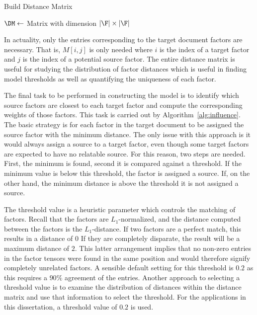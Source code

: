 \documentclass[../ut-dissertation.tex]{subfiles}
\begin{document}
\begin{algorithm}[p]
  \caption{Build Distance Matrix}
  \label{alg:distance}
   
  \Input{\F}
  \Output{\DM}
  \BlankLine
  $\DM \leftarrow $ Matrix with dimension $|\F| \times |\F|$\;
  \Return{\DM}
\end{algorithm}

In actuality, only the entries corresponding to the target document
factors are necessary.  That is, $M[i,j]$ is only needed where $i$ is
the index of a target factor and $j$ is the index of a potential
source factor.  The entire distance matrix is useful for studying the
distribution of factor distances which is useful in finding model
thresholds as well as quantifying the uniqueness of each factor. 

The final task to be performed in constructing the model is to
identify which source factors are closest to each target factor and
compute the corresponding weights of those factors.  This task is
carried out by Algorithm~\ref{alg:influence}.  The basic strategy is
for each factor in the target document to be assigned the source
factor with the minimum distance.  The only issue with this approach
is it would always assign a source to a target factor, even though
some target factors are expected to have no relatable source.  For
this reason, two steps are needed.  First, the minimum is found,
second it is compared against a threshold.  If the minimum value is
below this threshold, the factor is assigned a source.  If, on the
other hand, the minimum distance is above the threshold it is not
assigned a source.

The threshold value is a heuristic parameter which controls the
matching of factors. Recall that the factors are $L_1$-normalized, and
the distance computed between the factors is the $L_1$-distance. If
two factors are a perfect match, this results in a distance of $0$
If they are completely disparate, the result will be a maximum
distance of $2$.  This latter arrangement implies that no non-zero
entries in the factor tensors were found in the same position and
would therefore signify completely unrelated factors.  A sensible
default setting for this threshold is $0.2$ as this requires a $90\%$
agreement of the entries.  Another approach to
selecting a threshold value is to examine the distribution of
distances within the distance matrix and use that information to
select the threshold.  For the applications in this dissertation, a
threshold value of $0.2$ is used.
\end{document}
